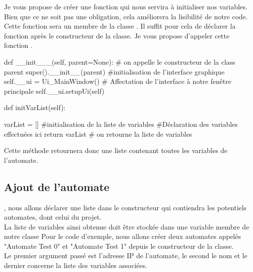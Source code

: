 Je vous propose de créer une fonction qui nous servira à initialiser nos variables. Bien que ce ne soit pas une obligation, cela améliorera la lisibilité de notre code.\newline
Cette fonction sera un membre de la classe .\newline
Il suffit pour cela de déclarer la fonction après le constructeur de la classe.\newline
Je vous propose d'appeler cette fonction .\smallSkip

\begin{pyCode}

    def __init___(self, parent=None):
        # on appelle le constructeur de la class parent
        super().__init__(parent)
        #initialisation de l’interface graphique
        self.__ui = Ui_MainWindow()
        # Affectation de l’interface à notre fenêtre principale
        self.__ui.setupUi(self)    

    def initVarList(self):

        varList = []  #initialisation de la liste de variables
        #Déclaration des variables effectuées ici
        return varList  # on retourne la liste de variables

\end{pyCode}

Cette méthode retournera donc une liste contenant toutes les variables de l'automate.\\


\subsection{Ajout de l'automate}

, nous allons déclarer une liste dans le constructeur qui contiendra les potentiels automates, dont celui du projet. \\
La liste de variables ainsi obtenue doit être stockée dans une variable membre de notre classe \smallSkip
Pour le code d'exemple, nous allons créer deux automates appelés "Automate Test 0" et "Automate Test 1" depuis le constructeur de la classe.\\

Le premier argument passé est l'adresse IP de l'automate, le second le nom et le dernier concerne la liste des variables associées.

